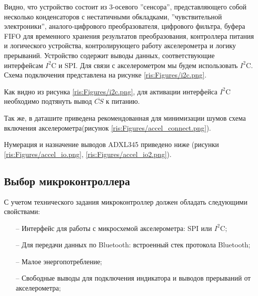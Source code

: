 \begin{sloppypar}

Видно, что устройство состоит из 3-осевого ''сенсора'',  представляющего собой несколько конденсаторов с нестатичными обкладками, ''чувствительной электроники'', аналого-цифрового преобразователя, цифрового фильтра, буфера FIFO для временного хранения результатов преобразования, контроллера питания и логического устройства, контролирующего работу акселерометра и логику прерываний. Устройство содержит выводы данных, соответствующие интерфейсам $I^2$C и SPI. Для связи с акселерометром мы будем использовать $I^2$C. Схема подключения представлена на рисунке \ref{ris:Figures/i2c.png}.




Как видно из рисунка \ref{ris:Figures/i2c.png}, для активации интерфейса $I^2$C необходимо подтянуть вывод $\overline{CS}$ к питанию.

Так же, в даташите приведена рекомендованная для минимизации шумов схема включения акселерометра(рисунок \ref{ris:Figures/accel_connect.png}).

Нумерация и назначение выводов ADXL345 приведено ниже (рисунки \ref{ris:Figures/accel_io.png}, \ref{ris:Figures/accel_io2.png}).




\subsection{Выбор микроконтроллера}
С учетом технического задания микроконтроллер должен обладать следующими свойствами:

\begin{onehalfspace}
	\begin{itemize}
		\item[--]Интерфейс для работы с микросхемой акселерометра: SPI или $I^2$C;
		\item[--]Для передачи данных по Bluetooth: встроенный стек протокола Bluetooth;
		\item[--]Малое энергопотребление;
		\item[--]Свободные выводы для подключения индикатора и выводов прерываний от акселерометра;
	\end{itemize}
\end{onehalfspace}


\end{sloppypar}
